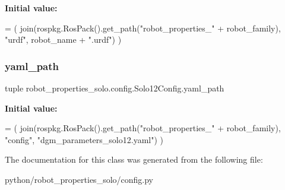 {\bfseries Initial value\+:}
\begin{DoxyCode}
=  (
        join(rospkg.RosPack().get\_path(\textcolor{stringliteral}{"robot\_properties\_"} + robot\_family),
             \textcolor{stringliteral}{"urdf"},
             robot\_name + \textcolor{stringliteral}{".urdf"})
    )
\end{DoxyCode}
\mbox{\label{classrobot__properties__solo_1_1config_1_1Solo12Config_a484dfe0fb7409d9848a6143f7e64955b}} 
\subsubsection{\texorpdfstring{yaml\+\_\+path}{yaml\_path}}
{\footnotesize\ttfamily tuple robot\+\_\+properties\+\_\+solo.\+config.\+Solo12\+Config.\+yaml\+\_\+path\hspace{0.3cm}{\ttfamily [static]}}

{\bfseries Initial value\+:}
\begin{DoxyCode}
=  (
        join(rospkg.RosPack().get\_path(\textcolor{stringliteral}{"robot\_properties\_"} + robot\_family),
             \textcolor{stringliteral}{"config"},
             \textcolor{stringliteral}{"dgm\_parameters\_solo12.yaml"})
    )
\end{DoxyCode}


The documentation for this class was generated from the following file\+:\begin{DoxyCompactItemize}
\item 
python/robot\+\_\+properties\+\_\+solo/config.\+py\end{DoxyCompactItemize}
